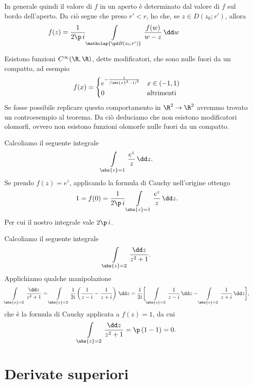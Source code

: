 \begin{oss}
	In generale quindi il valore di \(f\) in un aperto è determinato dal valore di \(f\) sul bordo dell'aperto. Da ciò segue che preso \(r'<r\), ho che, se \(z\in D(z_0;r')\), allora
	\[
		f(z) = \frac{1}{2\p\,i} \int\limits_{\mathclap{\pd B(z_0;r')}} \frac{f(w)}{w-z}\,\dd w \qquad\qquad 
	\]
\end{oss}

\begin{oss}
	Esistono funzioni \(C^{\infty}(\R,\R)\), dette modificatori, che sono nulle fuori da un compatto, ad esempio
	\[
		f(x) = 	\begin{cases}
			e^{-\frac{1}{{(\abs{x}^2-1)}^2}} & x\in(-1,1)        \\
			0                                & \text{altrimenti}
		\end{cases}
	\]
	Se fosse possibile replicare questo comportamento in \(\R^2 \to \R^2\) avremmo trovato un controesempio al teorema. Da ciò deduciamo che non esistono modificatori olomorfi, ovvero non esistono funzioni olomorfe nulle fuori da un compatto.
\end{oss}

\begin{ese}
	Calcoliamo il seguente integrale
	\[
		\int\limits_{\abs{z}=1} \frac{e^z}{z}\,\dd z.
	\]
	Se prendo \(f(z)=e^z\), applicando la formula di Cauchy nell'origine ottengo
	\[
		1=f(0) = \frac{1}{2\p\,i} \int\limits_{\abs{z}=1} \frac{e^z}{z}\,\dd z.
	\]
	Per cui il nostro integrale vale \(2\p\,i\).
\end{ese}

\begin{ese}
	Calcoliamo il seguente integrale
	\[
		\int\limits_{\abs{z}=2} \frac{\dd z}{z^2+1}.
	\]
	Applichiamo qualche manipolazione
	\[
		\int\limits_{\abs{z}=2} \frac{\dd z}{z^2+1} = \int\limits_{\abs{z}=2} \frac{1}{2i} \left( \frac{1}{z-i}-\frac{1}{z+i} \right)\,\dd z = \frac{1}{2i} \bigg[ \int\limits_{\abs{z}=2} \frac{1}{z-i}\,\dd z - \int\limits_{\abs{z}=2} \frac{1}{z+i}\,\dd z\bigg],
	\]
	che è la formula di Cauchy applicata a \(f(z)=1\), da cui
	\[
		\int\limits_{\abs{z}=2} \frac{\dd z}{z^2+1} = \p\,(1-1) = 0.
	\]
\end{ese}
\section{Derivate superiori}

